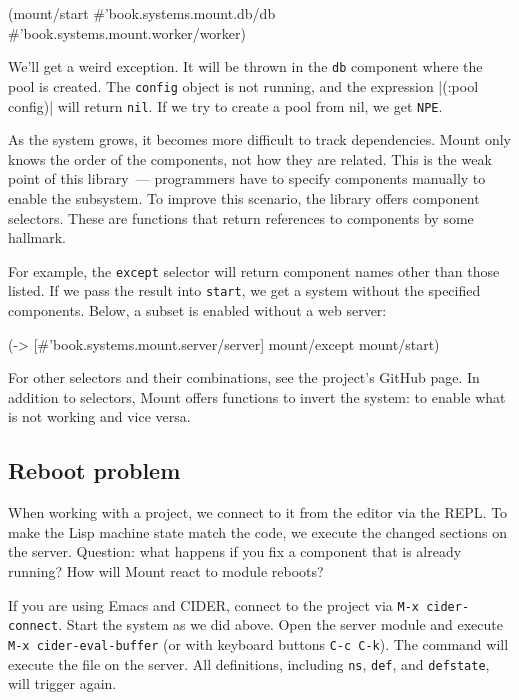 \begin{english}
  \begin{clojure}
(mount/start
  #'book.systems.mount.db/db
  #'book.systems.mount.worker/worker)
  \end{clojure}
\end{english}

We'll get a weird exception. It will be thrown in the \verb|db| component where the pool is created. The \verb|config| object is not running, and the expression \spverb|(:pool config)| will return \verb|nil|. If we try to create a pool from nil, we get \verb|NPE|.

As the system grows, it becomes more difficult to track dependencies. Mount only knows the order of the components, not how they are related. This is the weak point of this library~--- programmers have to specify components manually to enable the subsystem. To improve this scenario, the library offers component selectors. These are functions that return references to components by some hallmark.

For example, the \verb|except| selector will return component names other than those listed. If we pass the result into \verb|start|, we get a system without the specified components. Below, a subset is enabled without a web server:

\begin{english}
  \begin{clojure}
(-> [#'book.systems.mount.server/server]
    mount/except
    mount/start)
  \end{clojure}
\end{english}

For other selectors and their combinations, see the project's GitHub page. In addition to selectors, Mount offers functions to invert the system: to enable what is not working and vice versa.

\subsection{Reboot problem}

When working with a project, we connect to it from the editor via the REPL. To make the Lisp machine state match the code, we execute the changed sections on the server. Question: what happens if you fix a component that is already running? How will Mount react to module reboots?


If you are using Emacs and CIDER, connect to the project via \verb|M-x cider-connect|. Start the system as we did above. Open the server module and execute \verb|M-x cider-eval-buffer| (or with keyboard buttons \verb|C-c C-k|). The command will execute the file on the server. All definitions, including \verb|ns|, \verb|def|, and \verb|defstate|, will trigger again.

